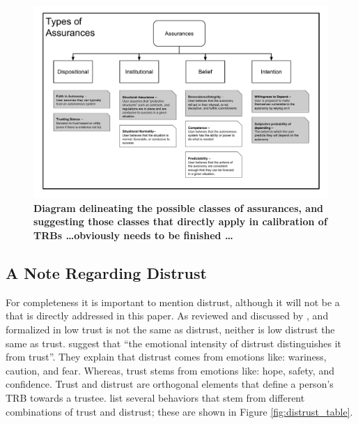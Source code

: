         \begin{figure}
            \includegraphics[width=8in]{Figures/Assurances.pdf}%
            \caption{\textbf{Diagram delineating the possible classes of assurances, and suggesting those classes that directly apply in calibration of TRBs \ldots obviously needs to be finished \ldots}}
            \label{fig:Assurance_classes}
        \end{figure}

    \subsection{A Note Regarding Distrust}
        For completeness it is important to mention distrust, although it will not be a that is directly addressed in this paper. As reviewed and discussed by \citet{Lewicki1998-ox}, and formalized in \cite{McKnight2001-hm,McKnight2001-gz} low trust is not the same as distrust, neither is low distrust the same as trust. \citet{McKnight2001-gz} suggest that ``the emotional intensity of distrust distinguishes it from trust''. They explain that distrust comes from emotions like: wariness, caution, and fear. Whereas, trust stems from emotions like: hope, safety, and confidence. Trust and distrust are orthogonal elements that define a person's TRB towards a trustee. \citet{Lewicki1998-ox} list several behaviors that stem from different combinations of trust and distrust; these are shown in Figure \ref{fig:distrust_table}.

